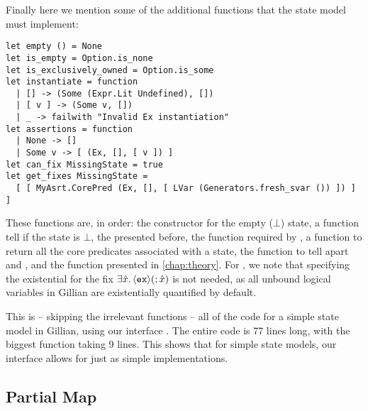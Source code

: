 Finally here we mention some of the additional functions that the state model must implement: \begin{lstlisting}
let empty () = None
let is_empty = Option.is_none
let is_exclusively_owned = Option.is_some
let instantiate = function
  | [] -> (Some (Expr.Lit Undefined), [])
  | [ v ] -> (Some v, [])
  | _ -> failwith "Invalid Ex instantiation"
let assertions = function
  | None -> []
  | Some v -> [ (Ex, [], [ v ]) ]
let can_fix MissingState = true
let get_fixes MissingState =
  [ [ MyAsrt.CorePred (Ex, [], [ LVar (Generators.fresh_svar ()) ]) ] ]
\end{lstlisting}
These functions are, in order: the constructor for the empty ($\bot$) state, a function tell if the state is $\bot$, the \isexowned{} presented before, the  function required by \PMap, a function to return all the core predicates associated with a state, the function to tell apart \Err{} and \Miss{}, and the \fix{} function presented in \cref{chap:theory}. For \fix, we note that specifying the existential for the fix $\exists\hat{x}\ldotp \left<\texttt{ex}\right>\!(;\hat{x})$ is not needed, as all unbound logical variables in Gillian are existentially quantified by default.

This is -- skipping the irrelevant functions -- all of the code for a simple state model in Gillian, using our interface . The entire code is 77 lines long, with the biggest function taking 9 lines. This shows that for simple state models, our interface allows for just as simple implementations.

\subsection{Partial Map}

